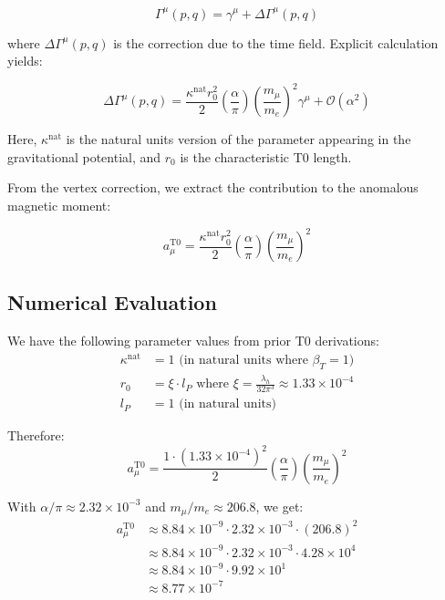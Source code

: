 \documentclass[12pt,a4paper]{article}
\begin{document}
	\begin{equation}
		\Gamma^{\mu}(p,q) = \gamma^{\mu} + \Delta\Gamma^{\mu}(p,q)
	\end{equation}
	
	where $\Delta\Gamma^{\mu}(p,q)$ is the correction due to the time field. Explicit calculation yields:
	
	\begin{equation}
		\Delta\Gamma^{\mu}(p,q) = \frac{\kappa^{\text{nat}}r_0^2}{2}\left(\frac{\alpha}{\pi}\right)\left(\frac{m_\mu}{m_e}\right)^2\gamma^{\mu} + \mathcal{O}(\alpha^2)
	\end{equation}
	
	Here, $\kappa^{\text{nat}}$ is the natural units version of the parameter appearing in the gravitational potential, and $r_0$ is the characteristic T0 length.
	
	From the vertex correction, we extract the contribution to the anomalous magnetic moment:
	
	\begin{equation}
		a_\mu^{\text{T0}} = \frac{\kappa^{\text{nat}}r_0^2}{2}\left(\frac{\alpha}{\pi}\right)\left(\frac{m_\mu}{m_e}\right)^2
	\end{equation}
	
	\subsection{Numerical Evaluation}
	
	We have the following parameter values from prior T0 derivations:
	\begin{align}
		\kappa^{\text{nat}} &= 1 \text{ (in natural units where $\beta_T = 1$)} \\
		r_0 &= \xi \cdot l_P \text{ where } \xi = \frac{\lambda_h}{32\pi^3} \approx 1.33 \times 10^{-4} \\
		l_P &= 1 \text{ (in natural units)}
	\end{align}
	
	Therefore:
	\begin{equation}
		a_\mu^{\text{T0}} = \frac{1 \cdot (1.33 \times 10^{-4})^2}{2}\left(\frac{\alpha}{\pi}\right)\left(\frac{m_\mu}{m_e}\right)^2
	\end{equation}
	
	With $\alpha/\pi \approx 2.32 \times 10^{-3}$ and $m_\mu/m_e \approx 206.8$, we get:
	\begin{align}
		a_\mu^{\text{T0}} &\approx 8.84 \times 10^{-9} \cdot 2.32 \times 10^{-3} \cdot (206.8)^2 \\
		&\approx 8.84 \times 10^{-9} \cdot 2.32 \times 10^{-3} \cdot 4.28 \times 10^4 \\
		&\approx 8.84 \times 10^{-9} \cdot 9.92 \times 10^1 \\
		&\approx 8.77 \times 10^{-7}
	\end{align}
	
\end{document}
